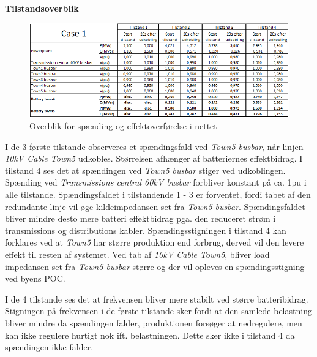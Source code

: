 \textbf{Tilstandsoverblik}
\begin{figure}[H] %
	\centering
	\includegraphics[width=1\textwidth]{figurer/SmallDisturbance/Overview}
	\caption{Overblik for spænding og effektoverførelse i nettet}
	\label{fig:C1Overview}
\end{figure}


I de 3 første tilstande observeres et spændingsfald ved \textit{Town5 busbar}, når linjen \textit{10kV Cable Town5} udkobles. Størrelsen afhænger af batteriernes effektbidrag. I tilstand 4 ses det at spændingen ved \textit{Town5 busbar} stiger ved udkoblingen. Spænding ved \textit{Transmissions central 60kV busbar} forbliver konstant på ca. 1pu i alle tilstande. Spændingsfaldet i tilstandende 1 - 3 er forventet, fordi tabet af den redundante linje vil øge kildeimpedansen set fra \textit{Town5 busbar}. Spændingsfaldet bliver mindre desto mere batteri effektbidrag pga. den reduceret strøm i transmissions og distributions kabler. Spændingsstigningen i tilstand 4 kan forklares ved at \textit{Town5} har større produktion end forbrug, derved vil den levere effekt til resten af systemet. Ved tab af \textit{10kV Cable Town5}, bliver load impedansen set fra \textit{Town5 busbar} større og der vil opleves en spændingsstigning ved byens POC.

I de 4 tilstande ses det at frekvensen bliver mere stabilt ved større batteribidrag. Stigningen på frekvensen i de første tilstande sker fordi at den samlede belastning bliver mindre da spændingen falder, produktionen forsøger at nedregulere, men kan ikke regulere hurtigt nok ift. belastningen. Dette sker ikke i tilstand 4 da spændingen ikke falder.   
